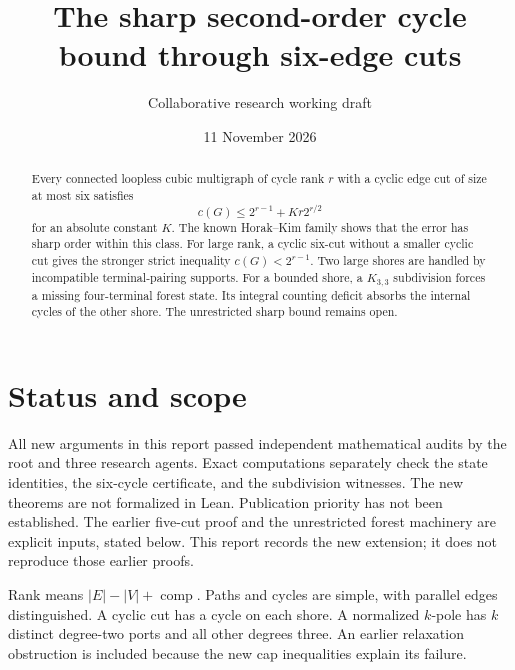 \documentclass[11pt]{article}
\title{The sharp second-order cycle bound through six-edge cuts}
\author{Collaborative research working draft}
\date{11 November 2026}
\begin{document}
\maketitle
\begin{abstract}
Every connected loopless cubic multigraph of cycle rank $r$ with a cyclic edge cut of size at most six satisfies
\[
 c(G)\le2^{r-1}+K r2^{r/2}
\]
for an absolute constant $K$.
The known Horak--Kim family shows that the error has sharp order within this class.
For large rank, a cyclic six-cut without a smaller cyclic cut gives the stronger strict inequality $c(G)<2^{r-1}$.
Two large shores are handled by incompatible terminal-pairing supports.
For a bounded shore, a $K_{3,3}$ subdivision forces a missing four-terminal forest state.
Its integral counting deficit absorbs the internal cycles of the other shore.
The unrestricted sharp bound remains open.
\end{abstract}
\section*{Status and scope}
All new arguments in this report passed independent mathematical audits by the root and three research agents.
Exact computations separately check the state identities, the six-cycle certificate, and the subdivision witnesses.
The new theorems are not formalized in Lean.
Publication priority has not been established.
The earlier five-cut proof and the unrestricted forest machinery are explicit inputs, stated below.
This report records the new extension; it does not reproduce those earlier proofs.

Rank means $|E|-|V|+\operatorname{comp}$.
Paths and cycles are simple, with parallel edges distinguished.
A cyclic cut has a cycle on each shore.
A normalized $k$-pole has $k$ distinct degree-two ports and all other degrees three.
An earlier relaxation obstruction is included because the new cap inequalities explain its failure.
\tableofcontents
\end{document}
